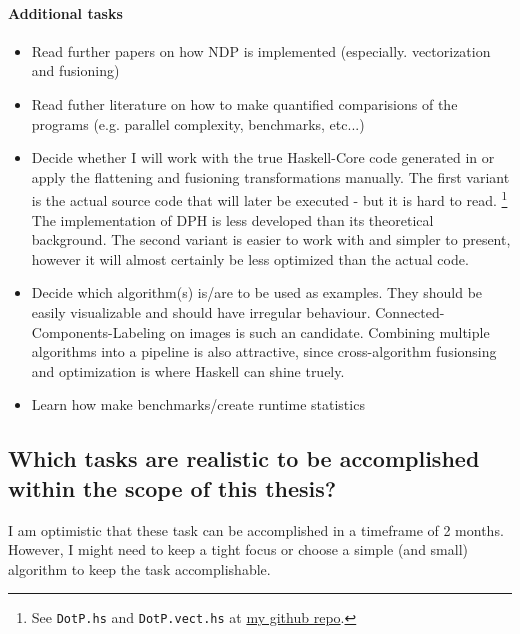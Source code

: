 \documentclass{article}
\begin{document}
    \paragraph{Additional tasks}
        \begin{itemize}
            \item Read further papers on how NDP is implemented (especially. vectorization and fusioning)
            \item Read futher literature on how to make quantified comparisions of the programs (e.g. parallel complexity, benchmarks, etc...)
            \item Decide whether I will work with the true Haskell-Core code generated in    or apply the flattening and fusioning transformations manually.
                The first variant is the actual source code that will later be executed - but it is hard to read. \footnote[1]{See \texttt{DotP.hs} and \texttt{DotP.vect.hs} at \href{https://github.com/GollyTicker/Nested-Data-Parallel-Haskell/tree/0e8d3df0d8084a01b007b27debda2b64247a254d}{my github repo}. }
                The implementation of DPH is less developed than its theoretical background.
                The second variant is easier to work with and simpler to present, however it will almost certainly be less optimized than the actual code.
            \item Decide which algorithm(s) is/are to be used as examples. They should be easily visualizable and should have irregular behaviour.
                Connected-Components-Labeling on images is such an candidate. Combining multiple algorithms into
                a pipeline is also attractive, since cross-algorithm fusionsing and optimization is where Haskell can shine truely.
            \item Learn how make benchmarks/create runtime statistics
        \end{itemize}

    \subsection{Which tasks are realistic to be accomplished within the scope of this thesis?}
    I am optimistic that these task can be accomplished in a timeframe of 2 months. However, I might need to keep a tight focus or
    choose a simple (and small) algorithm to keep the task accomplishable.
\end{document}
